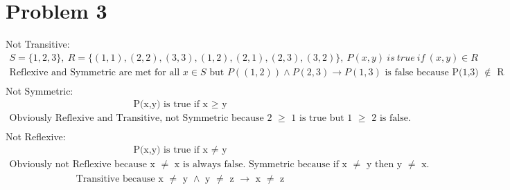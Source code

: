 \documentclass{article}
\begin{document}
\section{Problem 3}
Not Transitive: \\
\begin{align*}
	S = \{ 1, 2, 3\}, \ 
	R = \{(1,1), (2,2), (3,3), (1,2), (2,1), (2,3), (3,2)\}, \ 
	P(x,y)\ is\ true\ if\ (x,y) \in R\\
	\text{Reflexive and Symmetric are met for all $x\in S$ but $P((1,2)) \land P(2,3) \to P(1,3)$ is false because P(1,3) $\notin$ R}\\
\end{align*}
Not Symmetric:
\begin{align*}
	\text{P(x,y) is true if x $\geq$ y}
\end{align*}
\begin{align*}
	\text{Obviously Reflexive and Transitive, not Symmetric because 2 $\geq$ 1 is true but 1 $\geq$ 2 is false.}\\ 
\end{align*}
Not Reflexive:
\begin{align*}
	\text{P(x,y) is true if x $\neq$ y}
\end{align*}
\begin{align*}
	\text{Obviously not Reflexive because x $\neq$ x is always false. Symmetric because if x $\neq$ y then y $\neq$ x.}
\end{align*}
\begin{align*}
	\text{Transitive because x $\neq$ y $\land$ y $\neq$ z $\to$ x $\neq$ z}\\
\end{align*}
\end{document}
